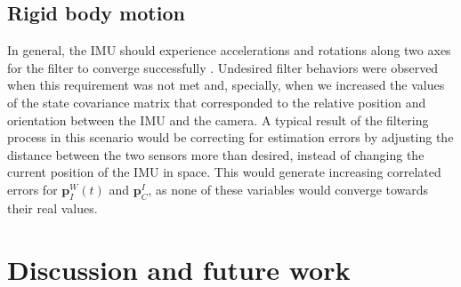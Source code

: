 \documentclass[letterpaper]{article}
\newcommand{\bb}[1]{\mathbf{#1}}
\begin{document}
\subsection{Rigid body motion}

In general, the IMU should experience accelerations and rotations
along two axes for the filter to converge successfully
\cite{2011:kelly:article}. Undesired filter behaviors were observed
when this requirement was not met and, specially, when we increased
the values of the state covariance matrix that corresponded to the
relative position and orientation between the IMU and the camera. 
A typical result of the filtering process in this scenario would be
correcting for estimation errors by adjusting the distance between the
two sensors more than desired, instead of changing the current
position of the IMU in space. This would generate increasing
correlated errors for $\bb{p}_I^W(t)$ and $\bb{p}_C^I$, as none of
these variables would converge towards their real values.


\section{Discussion and future work}




\end{document}
